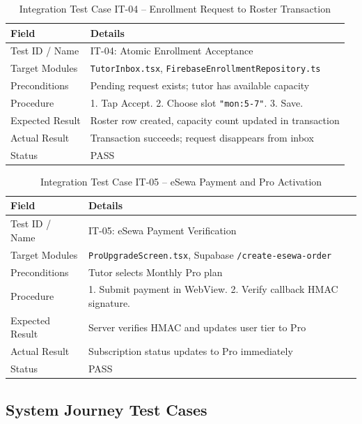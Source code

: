 \documentclass[12pt]{report}
\begin{document}
\begin{table}[H]
\centering
\caption{Integration Test Case IT-04 -- Enrollment Request to Roster Transaction}
\label{tab:it04}
\small
\begin{tabular}{|p{3.2cm}|p{11.5cm}|}
\hline
\textbf{Field} & \textbf{Details} \\
\hline
Test ID / Name & IT-04: Atomic Enrollment Acceptance \\
\hline
Target Modules & \texttt{TutorInbox.tsx}, \texttt{FirebaseEnrollmentRepository.ts} \\
\hline
Preconditions & Pending request exists; tutor has available capacity \\
\hline
Procedure & 1. Tap Accept. 2. Choose slot \texttt{"mon:5-7"}. 3. Save. \\
\hline
Expected Result & Roster row created, capacity count updated in transaction \\
\hline
Actual Result & Transaction succeeds; request disappears from inbox \\
\hline
Status & PASS \\
\hline
\end{tabular}
\end{table}

\begin{table}[H]
\centering
\caption{Integration Test Case IT-05 -- eSewa Payment and Pro Activation}
\label{tab:it05}
\small
\begin{tabular}{|p{3.2cm}|p{11.5cm}|}
\hline
\textbf{Field} & \textbf{Details} \\
\hline
Test ID / Name & IT-05: eSewa Payment Verification \\
\hline
Target Modules & \texttt{ProUpgradeScreen.tsx}, Supabase \texttt{/create-esewa-order} \\
\hline
Preconditions & Tutor selects Monthly Pro plan \\
\hline
Procedure & 1. Submit payment in WebView. 2. Verify callback HMAC signature. \\
\hline
Expected Result & Server verifies HMAC and updates user tier to Pro \\
\hline
Actual Result & Subscription status updates to Pro immediately \\
\hline
Status & PASS \\
\hline
\end{tabular}
\end{table}

\subsection{System Journey Test Cases}
\end{document}
